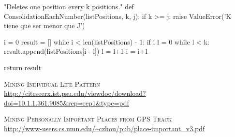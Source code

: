 \documentclass[a4paper, 12pt]{article}
\begin{document}
\begin{python}
"Deletes one position every k positions."
def ConsolidationEachNumber(listPositions, k, j):
	if k >= j:
    	raise ValueError('K tiene que ser menor que J')
        
	i = 0
    result = []
	while i < len(listPositions) - 1:
    	if i%
        	l = 0
           while l < k:
           		result.append(listPositions[i - l])
               l = l+1
			i = i+1

	return result
\end{python}
\newpage

\begin{thebibliography}{50}


\label{lifePatter} \textsc{Mining Individual Life Pattern} \\ \url{http://citeseerx.ist.psu.edu/viewdoc/download?doi=10.1.1.361.9085&rep=rep1&type=pdf}

\label{importantPlaces} \textsc{Mining Personally Important Places from GPS Track} \\ \url{http://www-users.cs.umn.edu/~czhou/pub/place-important_v3.pdf}

\end{thebibliography}
\end{document}
